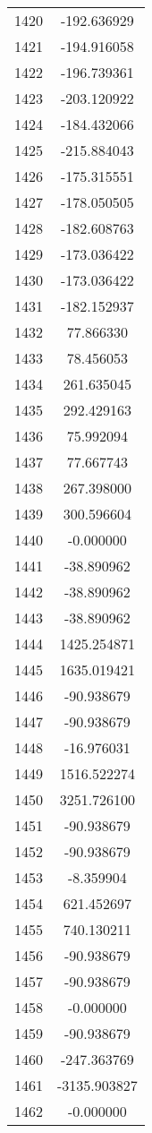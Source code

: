 \documentclass[12pt]{article}
\begin{document}
\begin{longtable}{@{}cc@{}}
1420 & -192.636929 \\
1421 & -194.916058 \\
1422 & -196.739361 \\
1423 & -203.120922 \\
1424 & -184.432066 \\
1425 & -215.884043 \\
1426 & -175.315551 \\
1427 & -178.050505 \\
1428 & -182.608763 \\
1429 & -173.036422 \\
1430 & -173.036422 \\
1431 & -182.152937 \\
1432 & 77.866330 \\
1433 & 78.456053 \\
1434 & 261.635045 \\
1435 & 292.429163 \\
1436 & 75.992094 \\
1437 & 77.667743 \\
1438 & 267.398000 \\
1439 & 300.596604 \\
1440 & -0.000000 \\
1441 & -38.890962 \\
1442 & -38.890962 \\
1443 & -38.890962 \\
1444 & 1425.254871 \\
1445 & 1635.019421 \\
1446 & -90.938679 \\
1447 & -90.938679 \\
1448 & -16.976031 \\
1449 & 1516.522274 \\
1450 & 3251.726100 \\
1451 & -90.938679 \\
1452 & -90.938679 \\
1453 & -8.359904 \\
1454 & 621.452697 \\
1455 & 740.130211 \\
1456 & -90.938679 \\
1457 & -90.938679 \\
1458 & -0.000000 \\
1459 & -90.938679 \\
1460 & -247.363769 \\
1461 & -3135.903827 \\
1462 & -0.000000 \\

\end{longtable}
\end{document}
